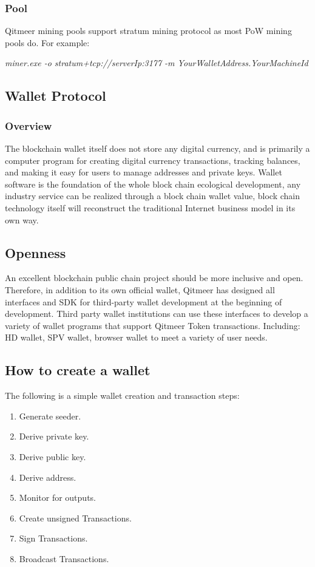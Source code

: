 \documentclass[a4paper,11pt]{article}
\begin{document}
\subsubsection*{Pool}
Qitmeer mining pools support stratum mining protocol as most PoW mining pools do.
For example:

\emph{miner.exe -o stratum+tcp://serverIp:3177 -m YourWalletAddress.YourMachineId}

\subsection{Wallet Protocol}
\subsubsection{Overview}
   The blockchain wallet itself does not store any digital currency, and is primarily a computer program for creating digital currency transactions, tracking balances, and making it easy for users to manage addresses and private keys. Wallet software is the foundation of the whole block chain ecological development, any industry service can be realized through a block chain wallet value, block chain technology itself will reconstruct the traditional Internet business model in its own way. 
\subsection*{Openness}
   An excellent blockchain public chain project should be more inclusive and open. Therefore, in addition to its own official wallet, Qitmeer has designed all interfaces and SDK for third-party wallet development at the beginning of development. Third party wallet institutions can use these interfaces to develop a variety of wallet programs that support Qitmeer Token transactions. Including: HD wallet, SPV wallet, browser wallet to meet a variety of user needs.
\subsection*{How to create a wallet}
   The following is a simple wallet creation and transaction steps:
\begin{enumerate}
	\item  Generate seeder.
    \item  Derive private key.
    \item  Derive public key.
    \item  Derive address.
    \item  Monitor for outputs.
    \item  Create unsigned Transactions.
    \item  Sign Transactions.
    \item  Broadcast Transactions.
\end{enumerate}
\end{document}
